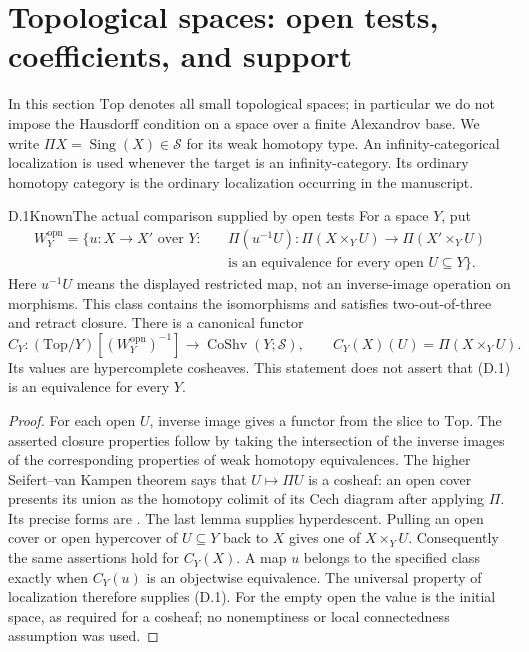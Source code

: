 \section{Topological spaces: open tests, coefficients, and support}

In this section $\mathrm{Top}$ denotes all small topological spaces; in
particular we do not impose the Hausdorff condition on a space over a finite
Alexandrov base. We write $\Pi X=\operatorname{Sing}(X)\in\mathcal S$ for its
weak homotopy type. An infinity-categorical localization is used whenever
the target is an infinity-category. Its ordinary homotopy category is the
ordinary localization occurring in the manuscript.

\begin{claim}{D.1}{Known}{The actual comparison supplied by open tests}
For a space $Y$, put
\[
 \begin{split}
 W^{\mathrm{opn}}_Y=\{u:X\longrightarrow X'\text{ over }Y:\quad&
   \Pi(u^{-1}U):\Pi(X\times_YU)\longrightarrow\Pi(X'\times_YU)\\
 &\text{is an equivalence for every open }U\subseteq Y\}.
 \end{split}
\]
Here $u^{-1}U$ means the displayed restricted map, not an inverse-image
operation on morphisms. This class contains the isomorphisms and satisfies
two-out-of-three and retract closure. There is a canonical functor
\[
 C_Y:(\mathrm{Top}/Y)[(W^{\mathrm{opn}}_Y)^{-1}]
       \longrightarrow\operatorname{CoShv}(Y;\mathcal S),\qquad
 C_Y(X)(U)=\Pi(X\times_YU).
\tag{D.1}
\]
Its values are hypercomplete cosheaves. This statement does not assert
that (D.1) is an equivalence for every $Y$.
\end{claim}
\begin{proof}
For each open $U$, inverse image gives a functor from the slice to
$\mathrm{Top}$. The asserted closure properties follow by taking the
intersection of the inverse images of the corresponding properties of
weak homotopy equivalences. The higher Seifert--van Kampen theorem says
that $U\mapsto\Pi U$ is a cosheaf: an open cover presents its union as the
homotopy colimit of its Cech diagram after applying $\Pi$. Its precise
forms are \citet[Proposition A.3.2, Remark A.3.8, and Lemma A.3.10]{DGLurieHA}.
The last lemma supplies hyperdescent. Pulling an open cover or open
hypercover of $U\subseteq Y$ back to $X$ gives one of $X\times_YU$.
Consequently the same assertions hold for $C_Y(X)$. A map $u$ belongs
to the specified class exactly when $C_Y(u)$ is an objectwise equivalence.
The universal property of localization therefore supplies (D.1).
For the empty open the value is the initial space, as required for a
cosheaf; no nonemptiness or local connectedness assumption was used.
\end{proof}

